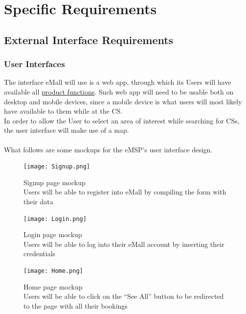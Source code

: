 \documentclass[11pt]{article}
\begin{document}
\newpage

\section{Specific Requirements}
\label{section:specificRequirements}

\subsection{External Interface Requirements}

\subsubsection{User Interfaces}

The interface eMall will use is a web app, through which its Users will have available all \hyperref[subsec:prodfunctions]{product functions}. Such web app will need to be usable both on desktop and mobile devices, since a mobile device is what users will most likely have available to them while at the CS. \\
In order to allow the User to select an area of interest while searching for CSs, the user interface will make use of a map. \\
\\
What follows are some mockups for the eMSP's user interface design.

\begin{figure}[!ht]
    \centering
    \texttt{[image: Signup.png]}
    \captionsetup{justification=centering,margin=2cm}
    \caption{Signup page mockup \\
    Users will be able to register into eMall by compiling the form with their data}
    \label{fig:my_label}
\end{figure}

\newpage

\begin{figure}[!ht]
    \centering
    \texttt{[image: Login.png]}
    \captionsetup{justification=centering,margin=2cm}
    \caption{Login page mockup \\
    Users will be able to log into their eMall account by inserting their credentials}
    \label{fig:my_label}
\end{figure}

\begin{figure}[!ht]
    \centering
    \texttt{[image: Home.png]}
    \captionsetup{justification=centering,margin=2cm}
    \caption{Home page mockup \\
    Users will be able to click on the “See All” button to be redirected to the page with all their bookings}
    \label{fig:my_label}
\end{figure}
\end{document}
